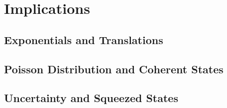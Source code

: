 \documentclass[a4paper]{article}
\numberwithin{equation}{section}
\begin{document}




\section{Implications}

\subsection{Exponentials and Translations}

\subsection{Poisson Distribution and Coherent States}

\subsection{Uncertainty and Squeezed States}

\begin{thebibliography}{99}

\end{thebibliography}
\end{document}

